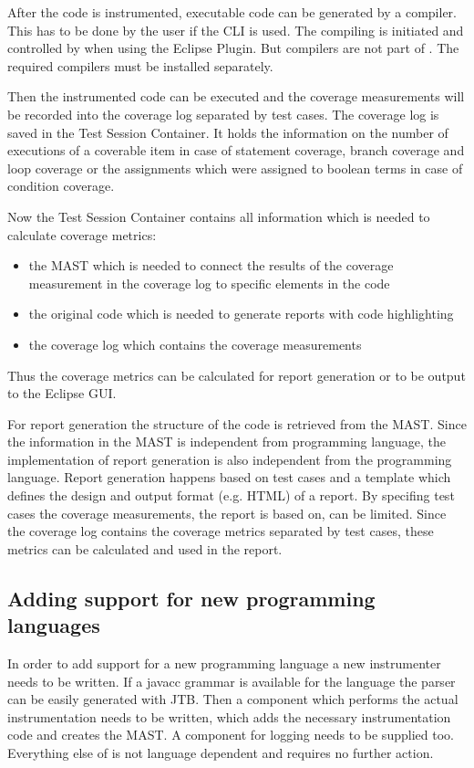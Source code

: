 After the code is instrumented, executable code can be generated by a compiler. This has to be done by the user if the CLI is used. The compiling is initiated and controlled by \gbt when using the Eclipse Plugin. But compilers are not part of \gbt. The required compilers must be installed separately.

Then the instrumented code can be executed and the coverage measurements will be recorded into the coverage log separated by test cases. The coverage log is saved in the Test Session Container. It holds the information on the number of executions of a coverable item in case of statement coverage, branch coverage and loop coverage or the assignments which were assigned to boolean terms in case of condition coverage.

Now the Test Session Container contains all information which is needed to calculate coverage metrics:
\begin{itemize}
 \item the MAST which is needed to connect the results of the coverage measurement in the coverage log to specific elements in the code
 \item the original code which is needed to generate reports with code highlighting
 \item the coverage log which contains the coverage measurements
\end{itemize}
Thus the coverage metrics can be calculated for report generation or to be output to the Eclipse GUI.

For report generation the structure of the code is retrieved from the MAST. Since the information in the MAST is independent from programming language, the implementation of report generation is also independent from the programming language. Report generation happens based on test cases and a template which defines the design and output format (e.g. HTML) of a report. By specifing test cases the coverage measurements, the report is based on, can be limited. Since the coverage log contains the coverage metrics separated by test cases, these metrics can be calculated and used in the report.
\subsection{Adding support for new programming languages}
\label{Adding_new_languages}
In order to add support for a new programming language a new instrumenter needs
to be written. If a javacc grammar is available for the language the parser can
be easily generated with JTB. Then a component which performs the actual
instrumentation needs to be written, which adds the necessary instrumentation code
and creates the MAST. %
A component for logging needs to be supplied too. Everything else of \gbt is
not language dependent and requires no further action.


